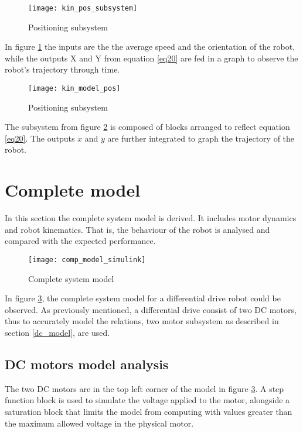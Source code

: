 {\begin{figure}[h]
\centering
\texttt{[image: kin\_pos\_subsystem]}
\caption{Positioning subsystem}
\label{fig::pos_sub}
\end{figure} 

In figure \ref{fig::pos_sub} the inputs are the the average speed and the orientation of the robot, while the outputs X and Y from equation \ref{eq20} are fed in a graph to observe the robot's trajectory through time. 

\begin{figure}[h]
\centering
\texttt{[image: kin\_model\_pos]}
\caption{Positioning subsystem}
\label{fig::pos_model}
\end{figure} 

The subsystem from figure \ref{fig::pos_model} is composed of blocks arranged to reflect equation \ref{eq20}. The outputs $\dot{x}$ and $\dot{y}$ are further integrated to graph the trajectory of the robot.

\section{Complete model}

In this section the complete system model is derived. It includes motor dynamics and robot kinematics. That is, the behaviour of the robot is analysed and compared with the expected performance.

\begin{figure}[h]
\centering
\texttt{[image: comp\_model\_simulink]}
\caption{Complete system model}
\label{fig::com_model}
\end{figure} 

In figure \ref{fig::com_model}, the complete system model for a differential drive robot could be observed. As previously mentioned, a differential drive consist of two DC motors, thus to accurately model the relations, two motor subsystem as described in section \ref{dc_model}, are used. 

\subsection{DC motors model analysis} 

The two DC motors are in the top left corner of the model in figure \ref{fig::com_model}. A step function block is used to simulate the voltage applied to the motor, alongside a saturation block that limits the model from  computing with values greater than the maximum allowed voltage in the physical motor. 

}
